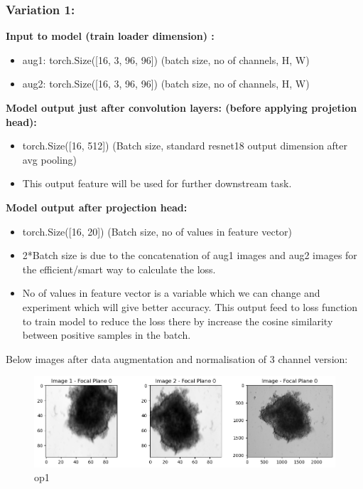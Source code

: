 \documentclass[a4paper,12pt]{report}
\begin{document}
\subsubsection{Variation 1:}
\textbf{Input to model (train loader dimension) :} 

\begin{itemize}
  \item aug1: torch.Size([16, 3, 96, 96])        (batch size, no of channels, H, W)
  \item aug2: torch.Size([16, 3, 96, 96])        (batch size, no of channels, H, W) \vspace{1em}
\end{itemize} \vspace{1em}
\textbf{Model output just after convolution layers: (before applying projetion head):} 
\begin{itemize}
  \item torch.Size([16, 512]) (Batch size, standard resnet18 output dimension after avg pooling)   
  \item This output feature will be used for further downstream task.  \vspace{1em}
\end{itemize}
\textbf{Model output after projection head:} 
\begin{itemize}
  \item torch.Size([16, 20])  (Batch size, no of values in feature vector)  

  \item 2*Batch size is due to the concatenation of aug1 images and aug2 images for the efficient/smart way to calculate the loss. 

  \item No of values in feature vector is a variable which we can change and experiment which will give better accuracy. This output feed to loss function to train model to reduce the loss there by increase the cosine similarity between positive samples in the batch.
\end{itemize}
Below images after data augmentation and normalisation of 3 channel version:

  \begin{figure}[H]
    \centering
    \includegraphics[width=0.9\linewidth]{figures/op1.png} %
    \caption{op1}
    \label{fig:out_2}
  \end{figure}
\end{document}
